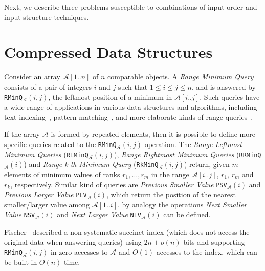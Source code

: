 Next, we describe three problems susceptible to combinations of input
order and input structure techniques.

\section{Compressed Data Structures}
\label{sec:compressed}

Consider an array ${\mathcal{A}}[1..n]$ of $n$ comparable objects. A \emph{Range
  Minimum
  Query}~\cite{1993-SICOMP-RecursiveStarTreeParallelDataStructure-BerkmanVishkin}
consists of a pair of integers $i$ and $j$ such that
$1\le i\le j\le n$, and is answered by
\texttt{RMinQ}$_{\mathcal{A}}(i,j)$, the leftmost position of a
minimum in $\mathcal{A}[i..j]$. Such queries have a wide range of
applications in various data structures and algorithms, including text
indexing~\cite{2009-TCS-FasterEntropyBoundedCompressedSuffixTrees-FischerMakinenNavarro},
pattern
matching~\cite{2008-STACS-ImprovedAlgorithmsForTheRangeNextValueProblemAndApplications-CrochemoreIliopoulosKubicaRahmanWalen},
and more elaborate kinds of range
queries~\cite{2004-ISAAC-OnTheRangeMaximumSumSegmentQueryProblem-ChenChao}.


If the array $\mathcal{A}$ is formed by repeated elements, then it is possible
to define more specific queries related to the
\texttt{RMinQ}$_{\mathcal{A}}(i,j)$ operation. The \emph{Range
  Leftmost Minimum Queries} (\texttt{RLMinQ}$_{\mathcal{A}}(i,j)$),
\emph{Range Rightmost Minimum Queries}
(\texttt{RRMinQ}$_{\mathcal{A}}(i)$) and \emph{Range k-th Minimum
  Query} (\texttt{RkMinQ}$_{\mathcal{A}}(i,j)$) return, given $m$
elements of minimum values of ranks $r_1, \dots, r_m$ in the range
${\mathcal{A}}[i..j]$, $r_1$, $r_m$ and $r_k$, respectively.
Similar kind of queries are \emph{Previous Smaller Value}
\texttt{PSV}$_{\mathcal{A}}(i)$ and \emph{Previous Larger Value}
\texttt{PLV}$_{\mathcal{A}}(i)$, which return the position of the nearest
smaller/larger value among ${\mathcal{A}}[1..i]$, by analogy the operations
\emph{Next Smaller Value} \texttt{NSV}$_{\mathcal{A}}(i)$ and \emph{Next Larger Value}
\texttt{NLV}$_{\mathcal{A}}(i)$ can be defined.

Fischer~\cite{2010-LATIN-OptimalSuccinctnessForRangeMinimumQueries-Fischer}
described a non-systematic succinct index (which does not access the
original data when answering queries) using $2n+o(n)$ bits and
supporting \texttt{RMinQ}$_{\mathcal{A}}(i,j)$ in zero accesses to
$\mathcal{A}$ and $O(1)$ accesses to the index, which can be built in
$O(n)$ time.

